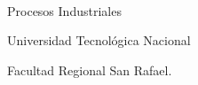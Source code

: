 \makeatletter
\begin{titlepage}
\pagestyle{empty}  
\centering
\vspace{2cm}
 \\
\vspace{1cm}
\begin{Huge}

\@title 

 
\end{Huge}
\vspace{1cm}
\begin{large}
Procesos Industriales 


Universidad Tecnológica Nacional 


  Facultad Regional San Rafael. 


\end{large}
\vspace{4cm}


\@author 


\@date 

\end{titlepage}
\newpage
